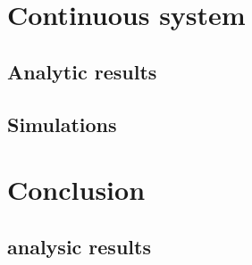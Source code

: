 \section{Continuous system}
  
  \subsection{Analytic results}
    
  \subsection{Simulations}
  	
\section{Conclusion}
\subsection{analysic results}
  
  \section*{}
 

